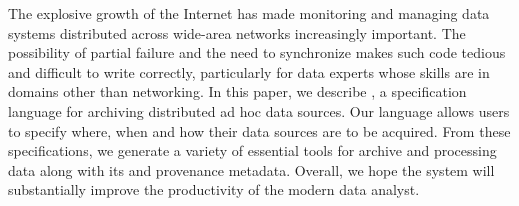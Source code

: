 The explosive growth of the Internet has made monitoring and managing
data systems distributed across wide-area networks increasingly
important.  The possibility of partial failure and the need to
synchronize makes such code tedious and difficult to write correctly,
particularly for data experts whose skills are in domains other than
networking. In this paper, we describe \padsd{}, a specification
language for archiving distributed ad hoc data sources.  Our language
allows users to specify where, when and how their data sources are
to be acquired. From these specifications,
we generate a variety of essential tools for archive and processing data along with its and provenance metadata.
Overall, we hope the system will substantially improve the productivity of
the modern data analyst.
